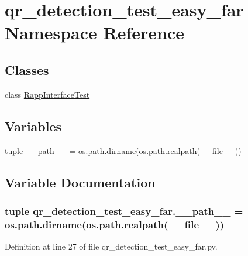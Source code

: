 \hypertarget{namespaceqr__detection__test__easy__far}{\section{qr\-\_\-detection\-\_\-test\-\_\-easy\-\_\-far Namespace Reference}
\label{namespaceqr__detection__test__easy__far}
}
\subsection*{Classes}
\begin{DoxyCompactItemize}
\item 
class \hyperlink{classqr__detection__test__easy__far_1_1RappInterfaceTest}{Rapp\-Interface\-Test}
\end{DoxyCompactItemize}
\subsection*{Variables}
\begin{DoxyCompactItemize}
\item 
tuple \hyperlink{namespaceqr__detection__test__easy__far_abea3a904361ae0a94498a162e29a241a}{\-\_\-\-\_\-path\-\_\-\-\_\-} = os.\-path.\-dirname(os.\-path.\-realpath(\-\_\-\-\_\-file\-\_\-\-\_\-))
\end{DoxyCompactItemize}


\subsection{Variable Documentation}
\hypertarget{namespaceqr__detection__test__easy__far_abea3a904361ae0a94498a162e29a241a}{
\subsubsection[{\-\_\-\-\_\-path\-\_\-\-\_\-}]{\setlength{\rightskip}{0pt plus 5cm}tuple qr\-\_\-detection\-\_\-test\-\_\-easy\-\_\-far.\-\_\-\-\_\-path\-\_\-\-\_\- = os.\-path.\-dirname(os.\-path.\-realpath(\-\_\-\-\_\-file\-\_\-\-\_\-))}}\label{namespaceqr__detection__test__easy__far_abea3a904361ae0a94498a162e29a241a}


Definition at line 27 of file qr\-\_\-detection\-\_\-test\-\_\-easy\-\_\-far.\-py.

